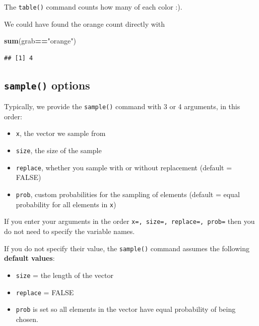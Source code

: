 \documentclass[
]{book}
\newenvironment{Shaded}{\begin{snugshade}}{\end{snugshade}}
\newcommand{\FunctionTok}[1]{\textcolor[rgb]{0.13,0.29,0.53}{\textbf{#1}}}
\newcommand{\NormalTok}[1]{#1}
\newcommand{\SpecialCharTok}[1]{\textcolor[rgb]{0.81,0.36,0.00}{\textbf{#1}}}
\newcommand{\StringTok}[1]{\textcolor[rgb]{0.31,0.60,0.02}{#1}}
\providecommand{\tightlist}{%
  \setlength{\itemsep}{0pt}\setlength{\parskip}{0pt}}
\theoremstyle{definition}
\theoremstyle{definition}
\theoremstyle{definition}
\theoremstyle{definition}
\theoremstyle{remark}
\begin{document}
The \texttt{table()} command counts how many of each color :).

We could have found the orange count directly with

\begin{Shaded}
\begin{Highlighting}[]
\FunctionTok{sum}\NormalTok{(grab}\SpecialCharTok{==}\StringTok{"orange"}\NormalTok{)}
\end{Highlighting}
\end{Shaded}

\begin{verbatim}
## [1] 4
\end{verbatim}

\subsection*{\texorpdfstring{\texttt{sample()} options}{sample() options}}\label{sample-options}

Typically, we provide the \texttt{sample()} command with 3 or 4 arguments, in this order:

\begin{itemize}
\tightlist
\item
  \texttt{x}, the vector we sample from
\item
  \texttt{size}, the size of the sample
\item
  \texttt{replace}, whether you sample with or without replacement (default = FALSE)
\item
  \texttt{prob}, custom probabilities for the sampling of elements (default = equal probability for all elements in \texttt{x})
\end{itemize}

If you enter your arguments in the order \texttt{x=,\ size=,\ replace=,\ prob=} then you do not need to specify the variable names.

If you do not specify their value, the \texttt{sample()} command assumes the following \textbf{default values}:

\begin{itemize}
\tightlist
\item
  \texttt{size} = the length of the vector
\item
  \texttt{replace} = FALSE
\item
  \texttt{prob} is set so all elements in the vector have equal probability of being chosen.
\end{itemize}
\end{document}
